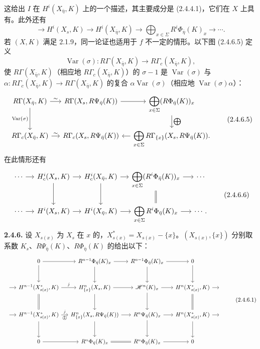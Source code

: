 这给出 $I$ 在 $H^i(X_{\bar\eta},K)$ 上的一个描述，其主要成分是 (2.4.4.1)，它们在 $X$ 上具有。此外还有
\[\longrightarrow H^i(X_s,K)\longrightarrow H^i(X_{\bar\eta},K)\longrightarrow\bigoplus_{x\in\Sigma}R^i\Phi_{\bar\eta}(K)_x\longrightarrow\cdots.\tag{2.4.6.3}\]
若 $(X,K)$ 满足 2.1.9，同一论证也适用于 $f$ 不一定的情形。以下图 (2.4.6.5) 定义
\[\operatorname{Var}(\sigma):R\Gamma(X_{\bar\eta},K)\longrightarrow R\Gamma_c(X_{\bar\eta},K),\tag{2.4.6.4}\]
使 $R\Gamma(X_{\bar\eta},K)$（相应地 $R\Gamma_c(X_{\bar\eta},K)$）的 $\sigma-1$ 是 $\operatorname{Var}(\sigma)$ 与 $\alpha:R\Gamma_c(X_{\bar\eta},K)\to R\Gamma(X_{\bar\eta},K)$ 的复合 $\alpha\operatorname{Var}(\sigma)$（相应地 $\operatorname{Var}(\sigma)\alpha$）：
\[
\begin{tikzcd}[column sep=small]
R\Gamma(X_{\bar\eta},K)\arrow[r,"\sim"]\arrow[d,"\operatorname{Var}(\sigma)"']&R\Gamma(X_s,R\Psi_{\bar\eta}(K))\arrow[r]&\displaystyle\bigoplus_{x\in\Sigma}(R\Phi_{\bar\eta}(K))_x\arrow[d,"\bigoplus"]\\
R\Gamma_c(X_{\bar\eta},K)\arrow[r,"\sim"]&R\Gamma_c(X_s,R\Psi_{\bar\eta}(K))&\displaystyle\bigoplus_{x\in\Sigma}R\Gamma_{\{x\}}(X_s,R\Psi_{\bar\eta}(K))\arrow[l].
\end{tikzcd}\tag{2.4.6.5}
\]
在此情形还有
\[
\begin{tikzcd}[column sep=small]
\cdots\arrow[r]&H_c^i(X_s,K)\arrow[r]\arrow[d]&H_c^i(X_{\bar\eta},K)\arrow[r]\arrow[d]&\displaystyle\bigoplus_{x\in\Sigma}(R^i\Phi_{\bar\eta}(K))_x\arrow[r]\arrow[d,equal]&\cdots\\
\cdots\arrow[r]&H^i(X_s,K)\arrow[r]&H^i(X_{\bar\eta},K)\arrow[r]&\displaystyle\bigoplus_{x\in\Sigma}R^i\Phi_{\bar\eta}(K)_x\arrow[r]&\cdots.
\end{tikzcd}\tag{2.4.6.6}
\]
\textbf{2.4.6.} 设 $X_{s(x)}$ 为 $X_s$ 在 $x$ 的，$X_{s(x)}^*=X_{s(x)}-\{x\}$。$(X_{s(x)},\{x\})$ 分别取系数 $K_s$、$R\Psi_{\bar\eta}(K)$、$R\Phi_{\bar\eta}(K)$ 的给出以下：
\[
\begin{tikzcd}[column sep=small,row sep=large]
&0\arrow[r]\arrow[d]&R^{n-1}\Phi_{\bar\eta}(K)_x\arrow[r]\arrow[d]&R^{n-1}\Phi_{\bar\eta}(K)_x\arrow[r]\arrow[d]&0\arrow[d]&\\
\arrow[r]&H^{n-1}(X_{s(x)}^*,K)\arrow[r,"j"]\arrow[d,equal]&H^n_{\{x\}}(X_s,K)\arrow[r]\arrow[d]&\mathscr H^n(K)_x\arrow[r]\arrow[d]&H^n(X_{s(x)}^*,K)\arrow[r]\arrow[d,equal]&{}\\
\arrow[r]&H^{n-1}(X_{s(x)}^*,K)\arrow[r,"j", "\text{\textcircled{1}}"']\arrow[d]&H^n_{\{x\}}(X_s,R\Psi_{\bar\eta}(K))\arrow[r]\arrow[d]&R^n\Psi_{\bar\eta}(K)_x\arrow[r]\arrow[d]&H^n(X_{s(x)}^*,K)\arrow[r]\arrow[d]&{}\\
&0\arrow[r]&R^n\Phi_{\bar\eta}(K)_x\arrow[r,equal]&R^n\Phi_{\bar\eta}(K)_x\arrow[r]&0&
\end{tikzcd}\tag{2.4.6.1}
\]
